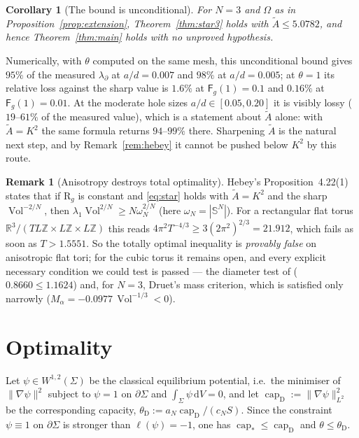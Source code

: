 \documentclass[11pt,reqno]{amsart}
\theoremstyle{plain}
\newtheorem{corollary}[theorem]{Corollary}
\theoremstyle{definition}
\newtheorem{remark}[theorem]{Remark}
\newcommand{\R}{\mathbb{R}}
\newcommand{\Sph}{\mathbb{S}}
\newcommand{\aN}{a_N}
\newcommand{\cN}{c_N}
\newcommand{\Vol}{\operatorname{Vol}}
\newcommand{\cpstar}{\operatorname{cap}_{*}}
\newcommand{\Fq}{\mathsf{F}}
\newcommand{\Sc}{\mathrm{R}}
\newcommand{\Ksob}{K}
\newcommand{\Atil}{\widetilde{A}}
\newcommand{\dd}{\,\mathrm{d}}
\begin{document}
\begin{corollary}[The bound is unconditional]
\label{cor:unconditional}
For $N=3$ and $\Omega$ as in Proposition~\ref{prop:extension},
Theorem~\ref{thm:star3} holds with $\Atil\le5.0782$, and hence
Theorem~\ref{thm:main} holds with no unproved hypothesis.
\end{corollary}

Numerically, with $\theta$ computed on the same mesh, this unconditional bound
gives $95\%$ of the measured $\lambda_\partial$ at $a/d=0.007$ and $98\%$ at
$a/d=0.005$; at $\theta=1$ its relative loss against the sharp value is $1.6\%$
at $\Fq_g(1)=0.1$ and $0.16\%$ at $\Fq_g(1)=0.01$. At the moderate hole sizes
$a/d\in[0.05,0.20]$ it is visibly lossy ($19$--$61\%$ of the measured value),
which is a statement about $\Atil$ alone: with $\Atil=\Ksob^2$ the same formula
returns $94$--$99\%$ there. Sharpening $\Atil$ is the natural next step, and by
Remark~\ref{rem:hebey} it cannot be pushed below $\Ksob^2$ by this route.

\begin{remark}[Anisotropy destroys total optimality]
\label{rem:anisotropy}
Hebey's Proposition~4.22(1) states that if $\Sc_g$ is constant and \eqref{eq:star}
holds with $\Atil=\Ksob^2$ and the sharp $\Vol^{-2/N}$, then
$\lambda_1\Vol^{2/N}\ge N\omega_N^{2/N}$ (here $\omega_N=|\Sph^N|$). For a
rectangular flat torus $\R^3/(TL\mathbb{Z}\times L\mathbb{Z}\times L\mathbb{Z})$
this reads $4\pi^2T^{-4/3}\ge3(2\pi^2)^{2/3}=21.912$, which fails as soon as
$T>1.5551$. So the totally optimal inequality is \emph{provably false} on
anisotropic flat tori; for the cubic torus it remains open, and every explicit
necessary condition we could test is passed --- the diameter test of
\cite[Prop.~4.26]{Hebey1996} ($0.8660\le1.1624$) and, for $N=3$, Druet's
mass criterion, which is satisfied only narrowly ($M_\alpha=-0.0977\,\Vol^{-1/3}<0$).
\end{remark}

\section{Optimality}
\label{sec:sharp}

Let $\psi\in W^{1,2}(\Sigma)$ be the classical equilibrium potential, i.e.\ the
minimiser of $\|\nabla\psi\|^2$ subject to $\psi=1$ on $\partial\Sigma$ and
$\int_\Sigma\psi\dd V=0$, and let
$\operatorname{cap}_{\mathrm D}:=\|\nabla\psi\|^2_{L^2}$ be the corresponding
capacity, $\theta_{\mathrm D}:=\aN\operatorname{cap}_{\mathrm D}/(\cN S)$. Since
the constraint $\psi\equiv1$ on $\partial\Sigma$ is stronger than
$\ell(\psi)=-1$, one has $\cpstar\le\operatorname{cap}_{\mathrm D}$ and
$\theta\le\theta_{\mathrm D}$.
\end{document}
